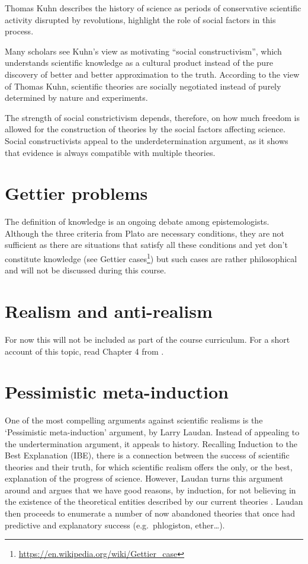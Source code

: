 \documentclass[
  12pt,
]{book}
\DeclareRobustCommand{\href}[2]{#2\footnote{\url{#1}}}
\begin{document}
Thomas Kuhn describes the history of science as periods of conservative scientific activity disrupted by revolutions, highlight the role of social factors in this process.

Many scholars see Kuhn's view as motivating ``social constructivism'', which understands scientific knowledge as a cultural product instead of the pure discovery of better and better approximation to the truth. According to the view of Thomas Kuhn, scientific theories are socially negotiated instead of purely determined by nature and experiments.

The strength of social constrictivism depends, therefore, on how much freedom is allowed for the construction of theories by the social factors affecting science. Social constructivists appeal to the underdetermination argument, as it shows that evidence is always compatible with multiple theories.

\section{Gettier problems}\label{gettier-problems}

The definition of knowledge is an ongoing debate among epistemologists. Although the three criteria from Plato are necessary conditions, they are not sufficient as there are situations that satisfy all these conditions and yet don't constitute knowledge (see \href{https://en.wikipedia.org/wiki/Gettier_case}{Gettier cases}) but such cases are rather philosophical and will not be discussed during this course.

\section{Realism and anti-realism}\label{realism}

For now this will not be included as part of the course curriculum. For a short account of this topic, read Chapter 4 from \citep{okasha-pos}.

\section{Pessimistic meta-induction}\label{pessimistic-meta-induction}

One of the most compelling arguments against scientific realisms is the `Pessimistic meta-induction' argument, by Larry Laudan. Instead of appealing to the undertermination argument, it appeals to history. Recalling Induction to the Best Explanation (IBE), there is a connection between the success of scientific theories and their truth, for which scientific realism offers the only, or the best, explanation of the progress of science. However, Laudan turns this argument around and argues that we have good reasons, by induction, for not believing in the existence of the theoretical entities described by our current theories \citep{ladyman2012understanding}. Laudan then proceeds to enumerate a number of now abandoned theories that once had predictive and explanatory success (e.g.~phlogiston, ether\ldots).
\end{document}

